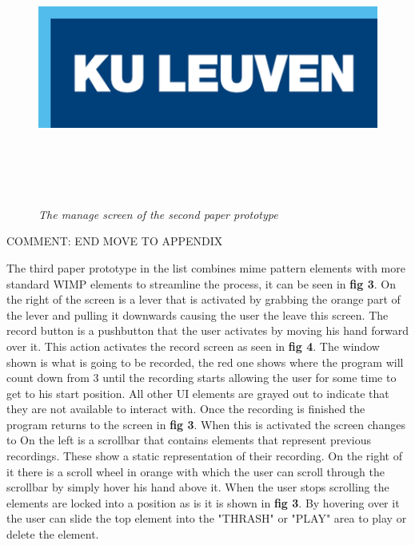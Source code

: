 \begin{figure}[H]
	\begin{center}
		\includegraphics[width=16cm, height=9cm]{KUL.png}
		\caption{\emph{The manage screen of the second paper prototype}}
		\label{The first paper prototype}
	\end{center}
\end{figure}

{\large COMMENT: END MOVE TO APPENDIX}

The third paper prototype in the list combines mime pattern elements with more standard WIMP elements to streamline the process, it can be seen in \textbf{ fig 3}. On the right of the screen is a lever that is activated by grabbing the orange part of the lever and pulling it downwards causing the user the leave this screen. The record button is a pushbutton that the user activates by moving his hand forward over it. This action activates the record screen as seen in \textbf{ fig 4}. The window shown is what is going to be recorded, the red one shows where the program will count down from 3 until the recording starts allowing the user for some time to get to his start position. All other UI elements are grayed out to indicate that they are not available to interact with. Once the recording is finished the program returns to the screen in \textbf{ fig 3}. When this is activated the screen changes to  On the left is a scrollbar that contains elements that represent previous recordings. These show a static representation of their recording. On the right of it there is a scroll wheel in orange with which the user can scroll through the scrollbar by simply hover his hand above it. When the user stops scrolling the elements are locked into a position as is it is shown in \textbf{ fig 3}. By hovering over it the user can slide the top element into the "THRASH" or "PLAY" area to play or delete the element. 

